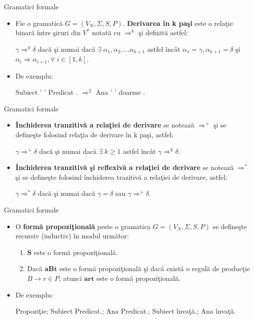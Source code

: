 \documentclass[pdf]{beamer}
\begin{document}
\begin{frame}{Gramatici formale}
\begin{itemize}
\item
Fie o gramatică $G = (V_{N}, \Sigma, S, P)$. \textbf{Derivarea în k paşi} este o relaţie binară între şiruri din $V^{*}$ notată cu $\Rightarrow^{k}$ şi definită astfel:

$\gamma \Rightarrow^{k} \delta$ dacă şi numai dacă $\exists \; \alpha_{1}, \alpha_{2}, \dots \alpha_{k+1}$ astfel încât $\alpha_{1} = \gamma, \alpha_{k+1} = \delta$ şi $\alpha_{i} \Rightarrow \alpha_{i+1}, \forall \; i \in [1,k]$.
\item
De exemplu:

Subiect ' ' Predicat . $\Rightarrow^{2}$ Ana ' ' doarme .
\end{itemize}
\end{frame}



\begin{frame}{Gramatici formale}
\begin{itemize}
\item
\textbf{Închiderea tranzitivă a relaţiei de derivare} se notează $\Rightarrow^{+}$ şi se defineşte folosind relaţia de derivare în k paşi, astfel:

$\gamma \Rightarrow^{+} \delta$ dacă şi  numai dacă $\exists \; k \geq 1$ astfel încât $\gamma \Rightarrow^{k} \delta$.

\item
\textbf{Închiderea tranzitivă şi reflexivă a relaţiei de derivare} se notează $\Rightarrow^{*}$ şi se defineşte folosind închiderea trazitivă a relaţiei de derivare, astfel:

$\gamma \Rightarrow^{*} \delta$ dacă şi  numai dacă $\gamma = \delta$ sau $\gamma \Rightarrow^{+} \delta$.
\end{itemize}
\end{frame}



\begin{frame}{Gramatici formale}
\begin{itemize}
\item
O \textbf{formă propoziţională} peste o gramatica $G = (V_{N}, \Sigma, S, P)$ se defineşte recursiv (inductiv) în modul următor:
\begin{enumerate}
\item
\textbf{S} este o formă propoziţională.
\item
Dacă $\textbf{aBt}$ este o formă propoziţională şi dacă există o regulă de producţie $B \rightarrow r \in P$, atunci $\textbf{art}$ este o formă propoziţională.
\end{enumerate}
\item
De exemplu:

Propoziţie; Subiect Predicat.; Ana Predicat.; Subiect învaţă.; Ana învaţă.
\end{itemize}
\end{frame}
\end{document}
